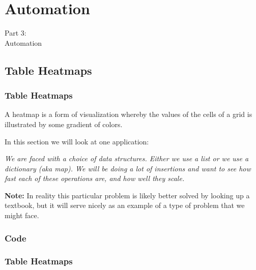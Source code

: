 
{
\renewcommand{\bgcolor}{auto}

\section{Automation}
\begin{frame}
  \vspace{25mm}
  \begin{center}
    \Huge{Part 3\pause:\\Automation}
  \end{center}
\end{frame}

\subsection{Table Heatmaps}
\begin{frame}[fragile]
  \frametitle{Table Heatmaps}
  \pause
  \vspace{3mm}
  A heatmap is a form of visualization whereby the values of the cells of a grid is illustrated by some gradient of colors.
  
  \pause
  \vspace{5mm}
  In this section we will look at one application:
  
  \begin{center}
    \textsl{We are faced with a choice of data structures. Either we use a list or we use a dictionary (aka map). We will be doing a lot of insertions and want to see how fast each of these operations are, and how well they scale.}
  \end{center}
  
  \pause
  \vspace{5mm}
  \textbf{Note:} In reality this particular problem is likely better solved by looking up a textbook, but it will serve nicely as an example of a type of problem that we might face.
\end{frame}

\subsubsection{Code}
\begin{frame}[fragile]
  \frametitle{Table Heatmaps }
  \vspace{0mm}
  \inputminted[fontsize=\tiny]{python}{../src/table_heatmap/code.py}
\end{frame}

}
